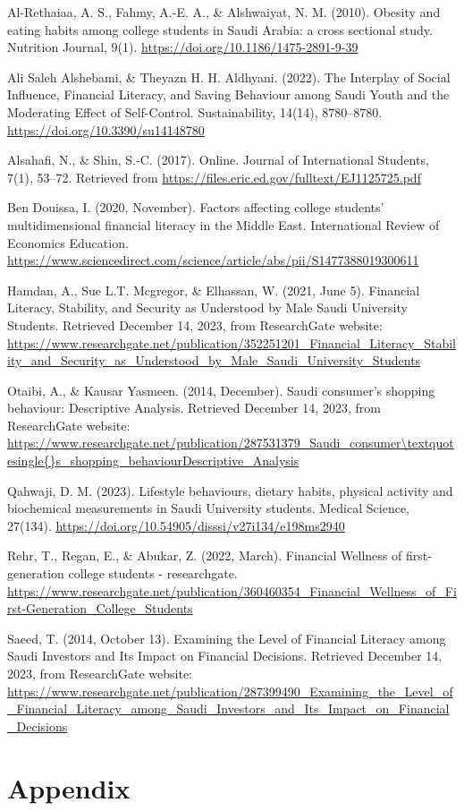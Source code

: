 \documentclass[
]{article}
\begin{document}
Al-Rethaiaa, A. S., Fahmy, A.-E. A., \& Alshwaiyat, N. M. (2010).
Obesity and eating habits among college students in Saudi Arabia: a
cross sectional study. Nutrition Journal, 9(1).
\url{https://doi.org/10.1186/1475-2891-9-39}

Ali Saleh Alshebami, \& Theyazn H. H. Aldhyani. (2022). The Interplay of
Social Influence, Financial Literacy, and Saving Behaviour among Saudi
Youth and the Moderating Effect of Self-Control. Sustainability, 14(14),
8780--8780. \url{https://doi.org/10.3390/su14148780}

Alsahafi, N., \& Shin, S.-C. (2017). Online. Journal of International
Students, 7(1), 53--72. Retrieved from
\url{https://files.eric.ed.gov/fulltext/EJ1125725.pdf}

Ben Douissa, I. (2020, November). Factors affecting college students'
multidimensional financial literacy in the Middle East. International
Review of Economics Education.
\url{https://www.sciencedirect.com/science/article/abs/pii/S1477388019300611}

Hamdan, A., Sue L.T. Mcgregor, \& Elhassan, W. (2021, June 5). Financial
Literacy, Stability, and Security as Understood by Male Saudi University
Students. Retrieved December 14, 2023, from ResearchGate website:
\url{https://www.researchgate.net/publication/352251201_Financial_Literacy_Stability_and_Security_as_Understood_by_Male_Saudi_University_Students}

Otaibi, A., \& Kausar Yasmeen. (2014, December). Saudi consumer's
shopping behaviour: Descriptive Analysis. Retrieved December 14, 2023,
from ResearchGate website:
\url{https://www.researchgate.net/publication/287531379_Saudi_consumer\textquotesingle{}s_shopping_behaviourDescriptive_Analysis}

Qahwaji, D. M. (2023). Lifestyle behaviours, dietary habits, physical
activity and biochemical measurements in Saudi University students.
Medical Science, 27(134).
\url{https://doi.org/10.54905/disssi/v27i134/e198ms2940}

Rehr, T., Regan, E., \& Abukar, Z. (2022, March). Financial Wellness of
first-generation college students - researchgate.
\url{https://www.researchgate.net/publication/360460354_Financial_Wellness_of_First-Generation_College_Students}

Saeed, T. (2014, October 13). Examining the Level of Financial Literacy
among Saudi Investors and Its Impact on Financial Decisions. Retrieved
December 14, 2023, from ResearchGate website:
\url{https://www.researchgate.net/publication/287399490_Examining_the_Level_of_Financial_Literacy_among_Saudi_Investors_and_Its_Impact_on_Financial_Decisions}

\hypertarget{appendix}{%
\section{Appendix}\label{appendix}}
\end{document}
